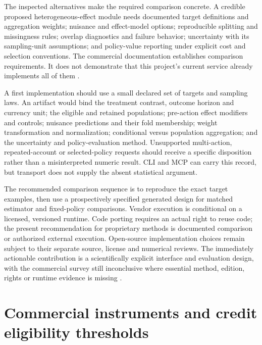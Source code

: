 The inspected alternatives make the required comparison concrete. A
credible proposed heterogeneous-effect module needs documented target
definitions and aggregation weights; nuisance and effect-model options;
reproducible splitting and missingness rules; overlap diagnostics and
failure behavior; uncertainty with its sampling-unit assumptions; and
policy-value reporting under explicit cost and selection conventions.
The commercial documentation establishes comparison requirements. It does
not demonstrate that this project's current service already implements
all of them \citep{exec13_ch_stata,exec13_ch_jmp_causal,exec13_ch_scope}.

A first implementation should use a small declared set of targets and
sampling laws. An artifact would bind the treatment contrast, outcome
horizon and currency unit; the eligible and retained populations;
pre-action effect modifiers and controls; nuisance predictions and their
fold membership; weight transformation and normalization; conditional
versus population aggregation; and the uncertainty and policy-evaluation
method. Unsupported multi-action, repeated-account or selected-policy
requests should receive a specific disposition rather than a
misinterpreted numeric result. CLI and MCP can carry this record, but
transport does not supply the absent statistical argument.

The recommended comparison sequence is to reproduce the exact target
examples, then use a prospectively specified generated design for matched
estimator and fixed-policy comparisons. Vendor execution is conditional
on a licensed, versioned runtime. Code porting requires an actual right
to reuse code; the present recommendation for proprietary methods is
documented comparison or authorized external execution. Open-source
implementation choices remain subject to their separate source, license
and numerical reviews. The immediately actionable contribution is a
scientifically explicit interface and evaluation design, with the
commercial survey still inconclusive where essential method, edition,
rights or runtime evidence is missing \citep{exec13_ch_scope}.
\label{exec13:commercial-heterogeneity-end}


\section{Commercial instruments and credit eligibility thresholds}
\label{exec13:commercial-iv-rd}

